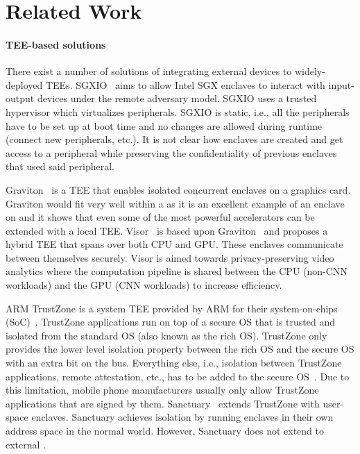 \section{Related Work}
\label{sec:relatedWork}


\setcounter{para}{0}
\paragraph{TEE-based solutions} There exist a number of solutions of integrating external devices to widely-deployed TEEs. SGXIO~\cite{weiser2017sgxio} aims to allow Intel SGX enclaves to interact with input-output devices under the remote adversary model. SGXIO uses a trusted hypervisor which virtualizes peripherals. SGXIO is static, i.e., all the peripherals have to be set up at boot time and no changes are allowed during runtime (connect new peripherals, etc.). It is not clear how enclaves are created and get access to a peripheral while preserving the confidentiality of previous enclaves that used said peripheral. 

Graviton~\cite{volos2018graviton} is a TEE that enables isolated concurrent enclaves on a graphics card. Graviton would fit very well within a \name{} as it is an excellent example of an enclave on \sphw and it shows that even some of the most powerful accelerators can be extended with a local TEE. Visor~\cite{visor} is based upon Graviton~\cite{volos2018graviton} and proposes a hybrid TEE that spans over both CPU and GPU. These enclaves communicate between themselves securely. Visor is aimed towards privacy-preserving video analytics where the computation pipeline is shared between the CPU (non-CNN workloads) and the GPU (CNN workloads) to increase efficiency. 

ARM TrustZone is a system TEE provided by ARM for their system-on-chips (SoC)~\cite{winter2008trusted}. TrustZone applications run on top of a secure OS that is trusted and isolated from the standard OS (also known as the rich OS). 
TrustZone only provides the lower level isolation property between the rich OS and the secure OS with an extra bit on the bus. Everything else, i.e., isolation between TrustZone applications, remote attestation, etc., has to be added to the secure OS~\cite{ning2014samsungknox}. Due to this limitation, mobile phone manufacturers usually only allow TrustZone applications that are signed by them. 
Sanctuary~\cite{brasser2019sanctuary} extends TrustZone with user-space enclaves. Sanctuary achieves isolation by running enclaves in their own address space in the normal world. However, Sanctuary does not extend to external \sphw.

